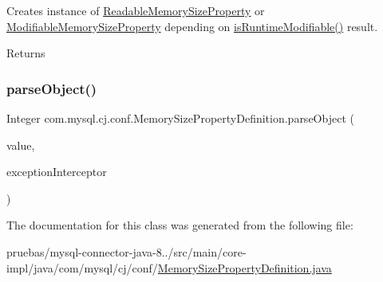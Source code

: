 Creates instance of \mbox{\hyperlink{classcom_1_1mysql_1_1cj_1_1conf_1_1_readable_memory_size_property}{Readable\+Memory\+Size\+Property}} or \mbox{\hyperlink{classcom_1_1mysql_1_1cj_1_1conf_1_1_modifiable_memory_size_property}{Modifiable\+Memory\+Size\+Property}} depending on \mbox{\hyperlink{classcom_1_1mysql_1_1cj_1_1conf_1_1_abstract_property_definition_a6c98140b2db84ccd0ff29ce165ec9ef5}{is\+Runtime\+Modifiable()}} result.

\begin{DoxyReturn}{Returns}

\end{DoxyReturn}
\mbox{\label{classcom_1_1mysql_1_1cj_1_1conf_1_1_memory_size_property_definition_a4fcf50ad05ab3a481e1a067927541afe}} 
\subsubsection{\texorpdfstring{parse\+Object()}{parseObject()}}
{\footnotesize\ttfamily Integer com.\+mysql.\+cj.\+conf.\+Memory\+Size\+Property\+Definition.\+parse\+Object (\begin{DoxyParamCaption}\item[{String}]{value,  }\item[{\mbox{\hyperlink{interfacecom_1_1mysql_1_1cj_1_1exceptions_1_1_exception_interceptor}{Exception\+Interceptor}}}]{exception\+Interceptor }\end{DoxyParamCaption})}



The documentation for this class was generated from the following file\+:\begin{DoxyCompactItemize}
\item 
pruebas/mysql-\/connector-\/java-\/8../src/main/core-\/impl/java/com/mysql/cj/conf/\mbox{\hyperlink{_memory_size_property_definition_8java}{Memory\+Size\+Property\+Definition.\+java}}\end{DoxyCompactItemize}
